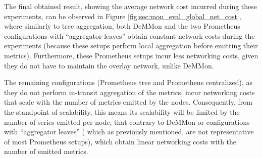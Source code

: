 The final obtained result, showing the average network cost incurred during these experiments, can be observed in Figure \ref{fig:sec:mon_eval_global_net_cost}, where similarly to tree aggregation, both DeMMon and the two Prometheus configurations with ``aggregator leaves'' obtain constant network costs during the experiments (because these setups perform local aggregation before emitting their metrics). Furthermore, these Prometheus setups incur less networking costs, given they do not have to maintain the overlay network, unlike DeMMon. 

The remaining configurations (Prometheus tree and Prometheus centralized), as they do not perform in-transit aggregation of the metrics, incur networking costs that scale with the number of metrics emitted by the nodes. Consequently, from the standpoint of scalability, this means its scalability will be limited by the number of series emitted per node, that contrary to DeMMon or configurations with ``aggregator leaves'' ( which as previously mentioned, are not representative of most Prometheus setups), which obtain linear networking costs with the number of emitted metrics.

